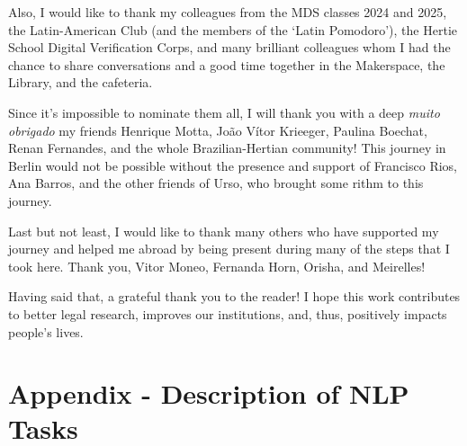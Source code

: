 \documentclass[
  12pt,
]{article}
\begin{document}
Also, I would like to thank my colleagues from the MDS classes 2024 and
2025, the Latin-American Club (and the members of the `Latin Pomodoro'),
the Hertie School Digital Verification Corps, and many brilliant
colleagues whom I had the chance to share conversations and a good time
together in the Makerspace, the Library, and the cafeteria.

Since it's impossible to nominate them all, I will thank you with a deep
\emph{muito obrigado} my friends Henrique Motta, João Vítor Krieeger,
Paulina Boechat, Renan Fernandes, and the whole Brazilian-Hertian
community! This journey in Berlin would not be possible without the
presence and support of Francisco Rios, Ana Barros, and the other
friends of Urso, who brought some rithm to this journey.

Last but not least, I would like to thank many others who have supported
my journey and helped me abroad by being present during many of the
steps that I took here. Thank you, Vitor Moneo, Fernanda Horn, Orisha,
and Meirelles!

Having said that, a grateful thank you to the reader! I hope this work
contributes to better legal research, improves our institutions, and,
thus, positively impacts people's lives.

\section{Appendix - Description of NLP Tasks}\label{sec-nlp-tasks}

\begingroup\fontsize{7}{9}\selectfont
\end{document}
